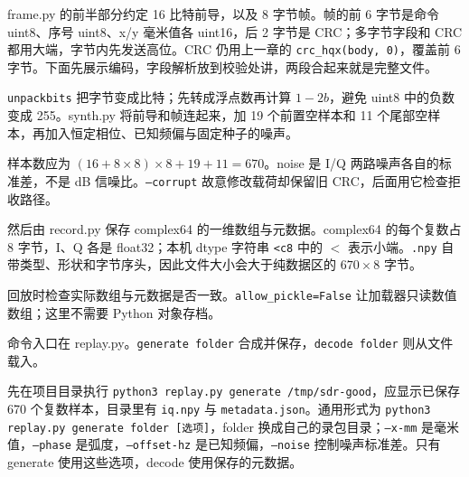 \begin{example}[造一帧你能看懂的信号]
frame.py 的前半部分约定 16 比特前导，以及 8 字节帧。帧的前 6 字节是命令 uint8、序号 uint8、x/y 毫米值各 uint16，后 2 字节是 CRC；多字节字段和 CRC 都用大端，字节内先发送高位。CRC 仍用上一章的 \texttt{crc\_hqx(body, 0)}，覆盖前 6 字节。下面先展示编码，字段解析放到校验处讲，两段合起来就是完整文件。
\begin{sdrblock}

\end{sdrblock}
\texttt{unpackbits} 把字节变成比特；先转成浮点数再计算 $1-2b$，避免 uint8 中的负数变成 255。synth.py 将前导和帧连起来，加 19 个前置空样本和 11 个尾部空样本，再加入恒定相位、已知频偏与固定种子的噪声。
\begin{sdrblock}

\end{sdrblock}
样本数应为 $(16+8\times8)\times8+19+11=670$。noise 是 I/Q 两路噪声各自的标准差，不是 dB 信噪比。\texttt{--corrupt} 故意修改载荷却保留旧 CRC，后面用它检查拒收路径。

然后由 record.py 保存 complex64 的一维数组与元数据。complex64 的每个复数占 8 字节，I、Q 各是 float32；本机 dtype 字符串 \texttt{<c8} 中的 $<$ 表示小端。\texttt{.npy} 自带类型、形状和字节序头，因此文件大小会大于纯数据区的 $670\times8$ 字节。
\begin{sdrblock}

\end{sdrblock}
回放时检查实际数组与元数据是否一致。\texttt{allow\_pickle=False} 让加载器只读数值数组；这里不需要 Python 对象存档。
\begin{sdrblock}

\end{sdrblock}
命令入口在 replay.py。\texttt{generate folder} 合成并保存，\texttt{decode folder} 则从文件载入。
\begin{sdrblock}

\end{sdrblock}
先在项目目录执行 \texttt{python3 replay.py generate /tmp/sdr-good}，应显示已保存 670 个复数样本，目录里有 \texttt{iq.npy} 与 \texttt{metadata.json}。通用形式为 \texttt{python3 replay.py generate folder [选项]}，folder 换成自己的录包目录；\texttt{--x-mm} 是毫米值，\texttt{--phase} 是弧度，\texttt{--offset-hz} 是已知频偏，\texttt{--noise} 控制噪声标准差。只有 generate 使用这些选项，decode 使用保存的元数据。
\end{example}
